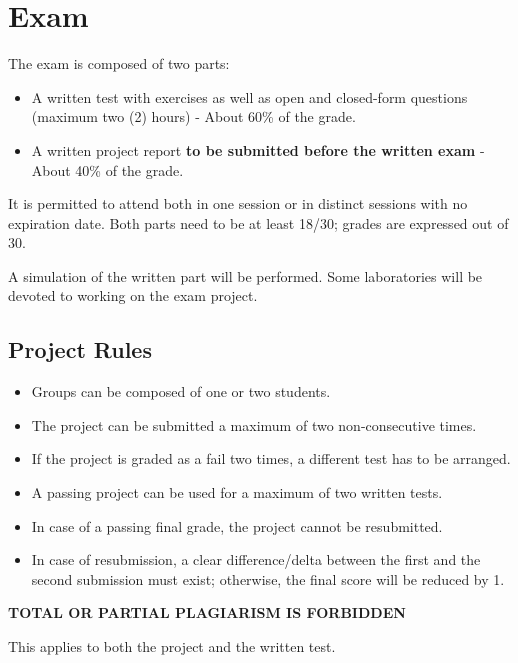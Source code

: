 \section{Exam}
The exam is composed of two parts:
\begin{itemize}
    \item A written test with exercises as well as open and closed-form questions (maximum two (2) hours) - About 60\% of the grade.
    \item A written project report \textbf{to be submitted before the written exam} - About 40\% of the grade.
\end{itemize}
It is permitted to attend both in one session or in distinct sessions with no expiration date. Both parts need to be at least 18/30; grades are expressed out of 30.

A simulation of the written part will be performed. Some laboratories will be devoted to working on the exam project.

\subsection{Project Rules}
\begin{itemize}
    \item Groups can be composed of one or two students.
    \item The project can be submitted a maximum of two non-consecutive times.
    \item If the project is graded as a fail two times, a different test has to be arranged.
    \item A passing project can be used for a maximum of two written tests.
    \item In case of a passing final grade, the project cannot be resubmitted.
    \item In case of resubmission, a clear difference/delta between the first and the second submission must exist; otherwise, the final score will be reduced by 1.
\end{itemize}

\textbf{TOTAL OR PARTIAL PLAGIARISM IS FORBIDDEN}

\noindent This applies to both the project and the written test.